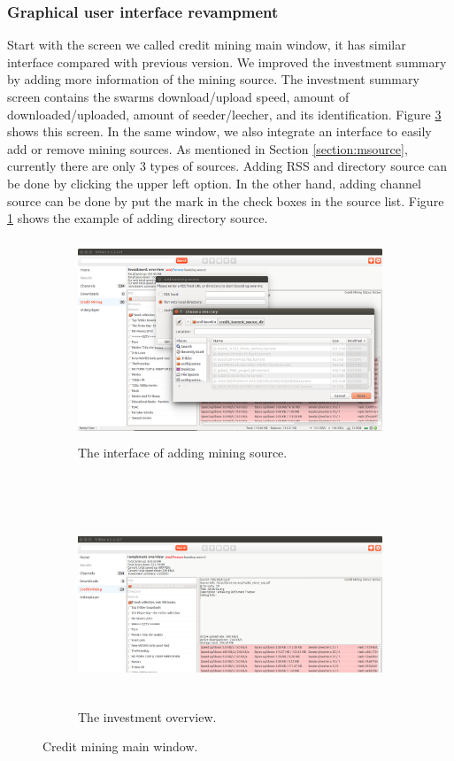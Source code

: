 \subsubsection{Graphical user interface revampment}
Start with the screen we called credit mining main window, it has similar interface compared with previous version. We improved the investment summary by adding more information of the mining source. The investment summary screen contains the swarms download/upload speed, amount of downloaded/uploaded, amount of seeder/leecher, and its identification. Figure \ref{fig:overview} shows this screen. In the same window, we also integrate an interface to easily add or remove mining sources. As mentioned in Section \ref{section:msource}, currently there are only 3 types of sources. Adding RSS and directory source can be done by clicking the upper left option. In the other hand, adding channel source can be done by put the mark in the check boxes in the source list. Figure \ref{fig:addsource} shows the example of adding directory source.

\begin{figure}[t!]
	\begin{adjustwidth}{-2.5cm}{}
		\begin{subfigure}[t]{0.6\textwidth}
			\centering
			\includegraphics[width=\textwidth, height=6cm]{pics/add_source.png}
			\caption{The interface of adding mining source.}
			\label{fig:addsource}
		\end{subfigure}
		~
		\begin{subfigure}[t]{0.8\textwidth}
			\centering
			\includegraphics[width=\textwidth, height=6cm]{pics/overview_result.png}
			\caption{The investment overview.}
			\label{fig:overview}
		\end{subfigure}
		\caption{Credit mining main window.}
	\end{adjustwidth}
\end{figure}

